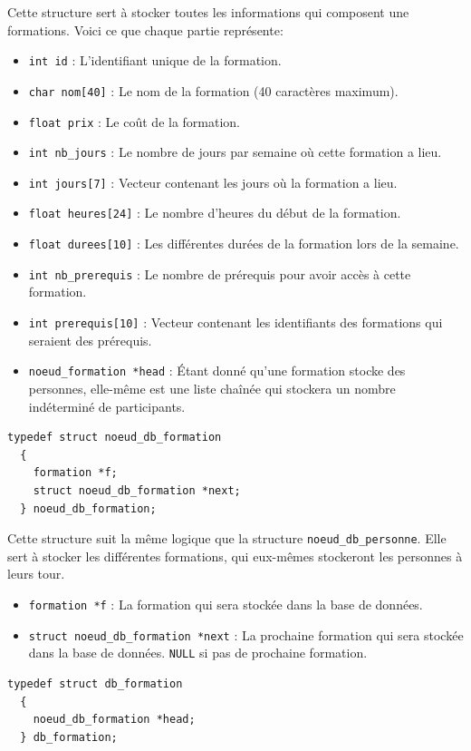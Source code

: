 \documentclass[11pt]{article}
\begin{document}
Cette structure sert à stocker toutes les informations qui composent une formations.
Voici ce que chaque partie représente:
\begin{itemize}
\item \texttt{int id} : L'identifiant unique de la formation.
\item \texttt{char nom[40]} : Le nom de la formation (40 caractères maximum).
\item \texttt{float prix} : Le coût de la formation.
\item \texttt{int nb\_jours} : Le nombre de jours par semaine où cette formation a lieu.
\item \texttt{int jours[7]} : Vecteur contenant les jours où la formation a lieu.
\item \texttt{float heures[24]} : Le nombre d'heures du début de la formation.
\item \texttt{float durees[10]} : Les différentes durées de la formation lors de la semaine.
\item \texttt{int nb\_prerequis} : Le nombre de prérequis pour avoir accès à cette formation.
\item \texttt{int prerequis[10]} : Vecteur contenant les identifiants des formations qui seraient des prérequis.
\item \texttt{noeud\_formation *head} : Étant donné qu'une formation stocke des personnes, elle-même est une liste chaînée qui stockera un nombre indéterminé de participants.
\end{itemize}

\begin{lstlisting}[firstnumber=115]
  typedef struct noeud_db_formation
  {
    formation *f;
    struct noeud_db_formation *next;
  } noeud_db_formation;
\end{lstlisting}

Cette structure suit la même logique que la structure \texttt{noeud\_db\_personne}. Elle sert à stocker les différentes formations, qui eux-mêmes stockeront les personnes à leurs tour.
\begin{itemize}
\item \texttt{formation *f} : La formation qui sera stockée dans la base de données.
\item \texttt{struct noeud\_db\_formation *next} : La prochaine formation qui sera stockée dans la base de données. \texttt{NULL} si pas de prochaine formation.
\end{itemize}

\begin{lstlisting}[firstnumber=127]
  typedef struct db_formation
  {
    noeud_db_formation *head;
  } db_formation;
\end{lstlisting}
\end{document}
